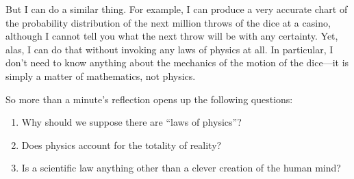 But I can do a similar thing. For example, I can produce a very accurate chart of the probability distribution of the next million throws of the dice at a casino, although I cannot tell you what the next throw will be with any certainty. Yet, alas, I can do that without invoking any laws of physics at all. In particular, I don't need to know anything about the mechanics of the motion of the dice---it is simply a matter of mathematics, not physics.

So more than a minute's reflection opens up the following questions:

\begin{enumerate}


\item Why should we suppose there are ``laws of physics''?

\item Does physics account for the totality of reality?

\item Is a scientific law anything other than a clever creation of the human mind?
\end{enumerate}




